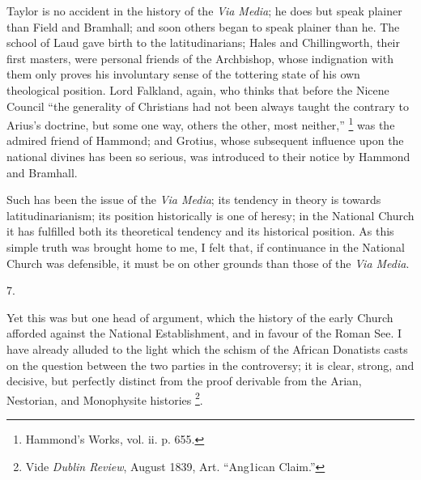 Taylor is no accident in the history of the \emph{Via Media}; he
does but speak plainer than Field and Bramhall; and soon others began
to speak plainer than he. The school of Laud gave birth to the
latitudinarians; Hales and Chillingworth, their first masters, were
personal friends of the Archbishop, whose indignation with them only
proves his involuntary sense of the tottering state of his own
theological position. Lord Falkland, again, who thinks that before the
Nicene Council ``the generality of Christians had not been always
taught the contrary to Arius's doctrine, but some one way, others the
other, most neither,'' \footnote{Hammond's Works, vol. ii. p. 655.}
was the admired friend of Hammond; and Grotius, whose subsequent
influence upon the national divines has been so serious, was introduced to their notice by Hammond and Bramhall.

Such has been the issue of the \emph{Via Media}; its tendency in
theory is towards latitudinarianism; its position historically is one
of heresy; in the National Church it has fulfilled both its
theoretical tendency and its historical position. As this simple truth
was brought home to me, I felt that, if continuance in the National
Church was defensible, it must be on other grounds than those of the \emph{Via
Media}.

7.

Yet this was but one head of argument, which the history of the
early Church afforded against the National Establishment, and in
favour of the Roman See. I have already alluded to the light which the
schism of the African Donatists casts on the question between the two
parties in the controversy; it is clear, strong, and decisive, but
perfectly distinct from the proof derivable from the Arian, Nestorian,
and Monophysite histories \footnote{Vide \emph{Dublin Review}, August 1839,
Art. ``Ang1ican Claim.''}.

